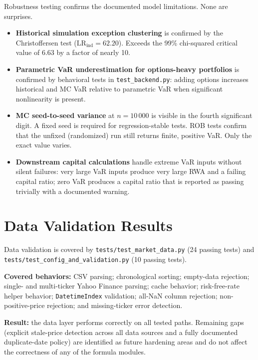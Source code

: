 \documentclass[11pt]{article}
\newcommand{\code}[1]{\texttt{#1}}
\begin{document}
Robustness testing confirms the documented model limitations. None
are surprises.

\begin{itemize}
  \item \textbf{Historical simulation exception clustering} is confirmed
    by the Christoffersen test ($\mathrm{LR}_{\mathrm{ind}} = 62.20$).
    Exceeds the 99\% chi-squared critical value of 6.63 by a factor of
    nearly 10.
  \item \textbf{Parametric VaR underestimation for options-heavy portfolios}
    is confirmed by behavioral tests in \code{test\_backend.py}: adding
    options increases historical and MC VaR relative to parametric VaR
    when significant nonlinearity is present.
  \item \textbf{MC seed-to-seed variance} at $n = 10\,000$ is visible in the
    fourth significant digit. A fixed seed is required for regression-stable
    tests.  ROB tests confirm that the unfixed (randomized) run still returns
    finite, positive VaR. Only the exact value varies.
  \item \textbf{Downstream capital calculations} handle extreme VaR inputs
    without silent failures: very large VaR inputs produce very large RWA
    and a failing capital ratio; zero VaR produces a capital ratio that is
    reported as passing trivially with a documented warning.
\end{itemize}

\section{Data Validation Results}

\begin{sloppypar}
Data validation is covered by \code{tests/\allowbreak test\_market\_data.py}
(24 passing tests) and \code{tests/\allowbreak test\_config\_and\_\allowbreak validation.py}
(10 passing tests).
\end{sloppypar}

\textbf{Covered behaviors:} CSV parsing; chronological sorting; empty-data
rejection; single- and multi-ticker Yahoo Finance parsing; cache behavior;
risk-free-rate helper behavior; \code{DatetimeIndex} validation; all-NaN
column rejection; non-positive-price rejection; and missing-ticker error
detection.

\textbf{Result:} the data layer performs correctly on all tested paths.
Remaining gaps (explicit stale-price detection across all data sources
and a fully documented duplicate-date policy) are identified as future
hardening areas and do not affect the correctness of any of the formula
modules.
\end{document}
